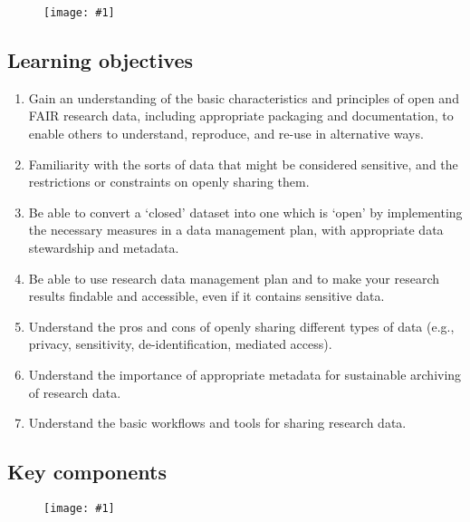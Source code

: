 \documentclass{article}
\newlength{\imgwidth}
\newcommand\scaledgraphics[2]{%
                
\settowidth{\imgwidth}{\texttt{[image: \#1]}}%
                
\setlength{\imgwidth}{\minof{\imgwidth}{#2\textwidth}}%
                
\texttt{[image: \#1]}%
                
}
\begin{document}
\begin{figure}
\scaledgraphics{9209bd39-910a-46c7-a66a-21a7bbfcd5f7.png}{1}
\label{F95132091}
\end{figure}


\subsection{Learning objectives}\label{learning-objectives}


\begin{enumerate}
\item Gain an understanding of the basic characteristics and principles of open and FAIR research data, including appropriate packaging and documentation, to enable others to understand, reproduce, and re-use in alternative ways.


\item Familiarity with the sorts of data that might be considered sensitive, and the restrictions or constraints on openly sharing them.


\item Be able to convert a ‘closed’ dataset into one which is ‘open’ by implementing the necessary measures in a data management plan, with appropriate data stewardship and metadata.


\item Be able to use research data management plan and to make your research results findable and accessible, even if it contains sensitive data.


\item Understand the pros and cons of openly sharing different types of data (e.g., privacy, sensitivity, de-identification, mediated access).


\item Understand the importance of appropriate metadata for sustainable archiving of research data.


\item Understand the basic workflows and tools for sharing research data.


\end{enumerate}

\subsection{Key components}\label{key-components}


\begin{figure}
\scaledgraphics{27d237d8-8f65-4eb1-9c68-f087921c61b9.png}{1}
\label{F39030411}
\end{figure}
\end{document}
